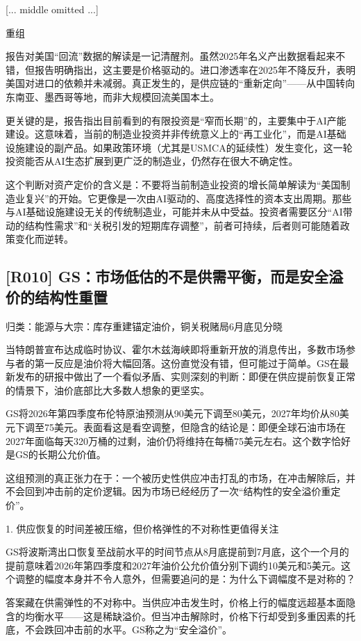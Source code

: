 \documentclass[11pt]{ctexart}
\begin{document}
[... middle omitted ...]

重组

报告对美国“回流”数据的解读是一记清醒剂。虽然2025年名义产出数据看起来不错，但报告明确指出，这主要是价格驱动的。进口渗透率在2025年不降反升，表明美国对进口的依赖并未减弱。真正发生的，是供应链的“重新定向”——从中国转向东南亚、墨西哥等地，而非大规模回流美国本土。

更关键的是，报告指出目前看到的有限投资是“窄而长期”的，主要集中于AI产能建设。这意味着，当前的制造业投资并非传统意义上的“再工业化”，而是AI基础设施建设的副产品。如果政策环境（尤其是USMCA的延续性）发生变化，这一轮投资能否从AI生态扩展到更广泛的制造业，仍然存在很大不确定性。

这个判断对资产定价的含义是：不要将当前制造业投资的增长简单解读为“美国制造业复兴”的开始。它更像是一次由AI驱动的、高度选择性的资本支出周期。那些与AI基础设施建设无关的传统制造业，可能并未从中受益。投资者需要区分“AI带动的结构性需求”和“关税引发的短期库存调整”，前者可持续，后者则可能随着政策变化而逆转。

\subsection{[R010] GS：市场低估的不是供需平衡，而是安全溢价的结构性重置}
{\small\color{refgray}归类：能源与大宗：库存重建锚定油价，铜关税赌局6月底见分晓}

当特朗普宣布达成临时协议、霍尔木兹海峡即将重新开放的消息传出，多数市场参与者的第一反应是油价将大幅回落。这份直觉没有错，但可能过于简单。GS在最新发布的研报中做出了一个看似矛盾、实则深刻的判断：即便在供应提前恢复正常的情景下，油价底部比大多数人想象的更坚实。

GS将2026年第四季度布伦特原油预测从90美元下调至80美元，2027年均价从80美元下调至75美元。表面看这是看空调整，但隐含的结论是：即便全球石油市场在2027年面临每天320万桶的过剩，油价仍将维持在每桶75美元左右。这个数字恰好是GS的长期公允价值。

这组预测的真正张力在于：一个被历史性供应冲击打乱的市场，在冲击解除后，并不会回到冲击前的定价逻辑。因为市场已经经历了一次“结构性的安全溢价重定价”。

1. 供应恢复的时间差被压缩，但价格弹性的不对称性更值得关注

GS将波斯湾出口恢复至战前水平的时间节点从8月底提前到7月底，这个一个月的提前意味着2026年第四季度和2027年油价公允价值分别下调约10美元和5美元。这个调整的幅度本身并不令人意外，但需要追问的是：为什么下调幅度不是对称的？

答案藏在供需弹性的不对称中。当供应冲击发生时，价格上行的幅度远超基本面隐含的均衡水平——这是稀缺溢价。但当冲击解除时，价格下行却受到多重因素的托底，不会跌回冲击前的水平。GS称之为“安全溢价”。
\end{document}
